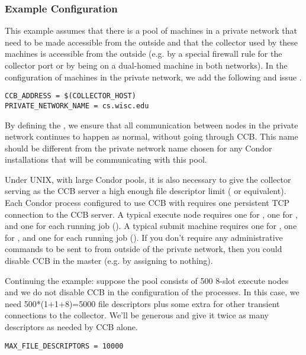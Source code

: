 \subsubsection{Example Configuration}

This example assumes that there is a pool of machines in a private
network that need to be made accessible from the outside and that the
collector used by these machines is accessible from the outside
(e.g. by a special firewall rule for the collector port or by being on
a dual-homed machine in both networks).  In the configuration of
machines in the private network, we add the following and issue
.

\begin{verbatim}
CCB_ADDRESS = $(COLLECTOR_HOST)
PRIVATE_NETWORK_NAME = cs.wisc.edu
\end{verbatim}

By defining the , we ensure that all
communication between nodes in the private network continues to happen
as normal, without going through CCB.  This name should be different
from the private network name chosen for any Condor installations that
will be communicating with this pool.

Under UNIX, with large Condor pools, it is also necessary to give the
collector serving as the CCB server a high enough file descriptor
limit ( or equivalent).  Each Condor
process configured to use CCB with  requires one
persistent TCP connection to the CCB server.  A typical execute node
requires one for , one for , and one for
each running job ().  A typical submit machine
requires one for , one for , and one for
each running job ().  If you don't require any
administrative commands to be sent to  from outside of
the private network, then you could disable CCB in the master
(e.g. by assigning  to nothing).

Continuing the example: suppose the pool consists of 500 8-slot
execute nodes and we do not disable CCB in the configuration of the
 processes.  In this case, we need 500*(1+1+8)=5000
file descriptors plus some extra for other transient connections to
the collector.  We'll be generous and give it twice as many
descriptors as needed by CCB alone.

\begin{verbatim}
MAX_FILE_DESCRIPTORS = 10000
\end{verbatim}

